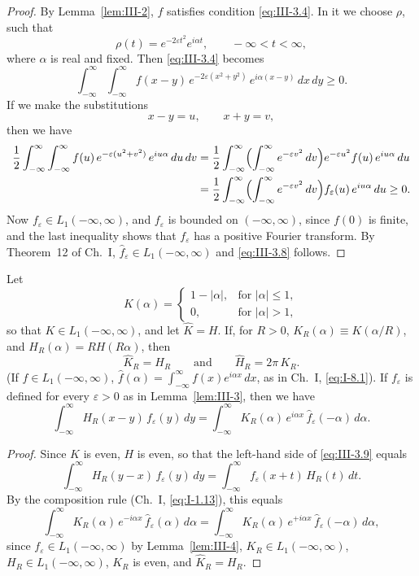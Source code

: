 \begin{proof}
By Lemma~\ref{lem:III-2}, $f$ satisfies condition \eqref{eq:III-3.4}. In it we choose $\rho$, such that
\[
\rho(t)=e^{-2\varepsilon t^{2}}e^{i\alpha t},\qquad-\infty<t<\infty,
\]
where $\alpha$ is real and fixed. Then \eqref{eq:III-3.4} becomes
\[
\int_{-\infty}^{\infty}\int_{-\infty}^{\infty}f(x-y)\,e^{-2\varepsilon(x^{2}+y^{2})}\,e^{i\alpha(x-y)}\,dx\,dy\ge0.
\]
If we make the substitutions
\[
x-y=u,\qquad x+y=v,
\]
then we have
\begin{align*}
\frac12\int_{-\infty}^{\infty}\int_{-\infty}^{\infty}f(u)\,e^{-\varepsilon(u^{2}+v^{2})}\,e^{iu\alpha}\,du\,dv
&=\frac12\int_{-\infty}^{\infty}\Bigl(\int_{-\infty}^{\infty}e^{-\varepsilon v^{2}}\,dv\Bigr)e^{-\varepsilon u^{2}}f(u)\,e^{iu\alpha}\,du\\
&=\frac12\int_{-\infty}^{\infty}\Bigl(\int_{-\infty}^{\infty}e^{-\varepsilon v^{2}}\,dv\Bigr)f_{\varepsilon}(u)\,e^{iu\alpha}\,du\ge0.
\end{align*}
Now $f_{\varepsilon}\in L_{1}(-\infty,\infty)$, and $f_{\varepsilon}$ is bounded on $(-\infty,\infty)$, since $f(0)$ is finite, and the last inequality shows that $f_{\varepsilon}$ has a positive Fourier transform. By Theorem~12 of Ch.~I, $\hat f_{\varepsilon}\in L_{1}(-\infty,\infty)$ and \eqref{eq:III-3.8} follows.
\end{proof}

\begin{lemma}\label{lem:III-5}
Let
\[
K(\alpha)=
\begin{cases}
1-|\alpha|,&\text{for }|\alpha|\le1,\\
0,&\text{for }|\alpha|>1,
\end{cases}
\]
so that $K\in L_{1}(-\infty,\infty)$, and let $\hat K=H$. If, for $R>0$, $K_{R}(\alpha)\equiv K(\alpha/R)$, and $H_{R}(\alpha)=RH(R\alpha)$, then
\[
\hat K_{R}=H_{R}\qquad\text{and}\qquad\hat H_{R}=2\pi\,K_{R}.
\]
(If $f\in L_{1}(-\infty,\infty)$, $\hat f(\alpha)=\int_{-\infty}^{\infty}f(x)e^{i\alpha x}\,dx$, as in Ch.~I, \eqref{eq:I-8.1}). If $f_{\varepsilon}$ is defined for every $\varepsilon>0$ as in Lemma~\ref{lem:III-3}, then we have
\begin{equation}\tag{3.9}\label{eq:III-3.9}
\int_{-\infty}^{\infty}H_{R}(x-y)\,f_{\varepsilon}(y)\,dy
=\int_{-\infty}^{\infty}K_{R}(\alpha)\,e^{i\alpha x}\,\hat f_{\varepsilon}(-\alpha)\,d\alpha.
\end{equation}
\end{lemma}

\begin{proof}
Since $K$ is even, $H$ is even, so that the left-hand side of \eqref{eq:III-3.9} equals
\[
\int_{-\infty}^{\infty}H_{R}(y-x)\,f_{\varepsilon}(y)\,dy
=\int_{-\infty}^{\infty}f_{\varepsilon}(x+t)\,H_{R}(t)\,dt.
\]
By the composition rule (Ch.~I, \eqref{eq:I-1.13}), this equals
\[
\int_{-\infty}^{\infty}K_{R}(\alpha)\,e^{-i\alpha x}\,\hat f_{\varepsilon}(\alpha)\,d\alpha
=\int_{-\infty}^{\infty}K_{R}(\alpha)\,e^{+i\alpha x}\,\hat f_{\varepsilon}(-\alpha)\,d\alpha,
\]
since $f_{\varepsilon}\in L_{1}(-\infty,\infty)$ by Lemma~\ref{lem:III-4}, $K_{R}\in L_{1}(-\infty,\infty)$, $H_{R}\in L_{1}(-\infty,\infty)$, $K_{R}$ is even, and $\hat K_{R}=H_{R}$.
\end{proof}

